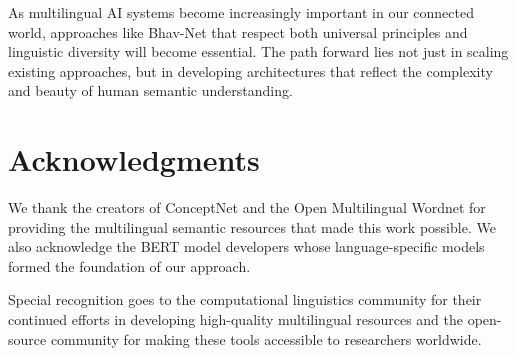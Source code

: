 \documentclass[11pt]{article}
\begin{document}
As multilingual AI systems become increasingly important in our connected world, approaches like Bhav-Net that respect both universal principles and linguistic diversity will become essential. The path forward lies not just in scaling existing approaches, but in developing architectures that reflect the complexity and beauty of human semantic understanding.

\section*{Acknowledgments}

We thank the creators of ConceptNet and the Open Multilingual Wordnet for providing the multilingual semantic resources that made this work possible. We also acknowledge the BERT model developers whose language-specific models formed the foundation of our approach.

Special recognition goes to the computational linguistics community for their continued efforts in developing high-quality multilingual resources and the open-source community for making these tools accessible to researchers worldwide.



\end{document}
